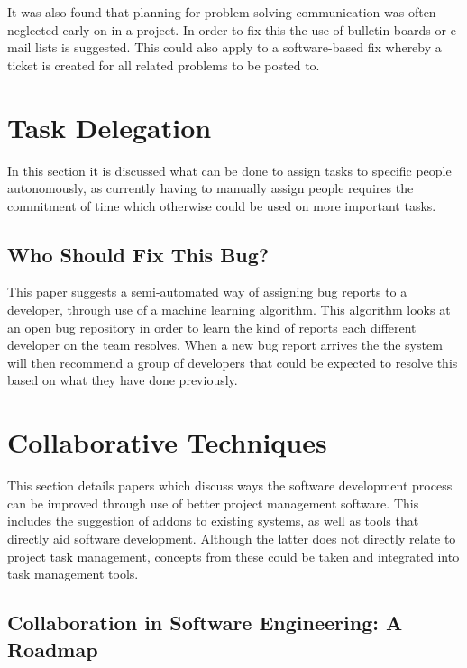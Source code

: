 \documentclass{l4proj}
\begin{document}
It was also found that planning for problem-solving communication was often neglected early on in a project.  In order to fix this the use of bulletin boards or e-mail lists is suggested.  This could also apply to a software-based fix whereby a ticket is created for all related problems to be posted to.

\section {Task Delegation}

In this section it is discussed what can be done to assign tasks to specific people autonomously, as currently having to manually assign people requires the commitment of time which otherwise could be used on more important tasks.


\subsection {Who Should Fix This Bug?}

This paper suggests a semi-automated way of assigning bug reports to a developer, through use of a machine learning algorithm.  This algorithm looks at an open bug repository in order to learn the kind of reports each different developer on the team resolves.  When a new bug report arrives the the system will then recommend a group of developers that could be expected to resolve this based on what they have done previously.%
\section {Collaborative Techniques}

This section details papers which discuss ways the software development process can be improved through use of better project management software.  This includes the suggestion of addons to existing systems, as well as tools that directly aid software development. Although the latter does not directly relate to project task management, concepts from these could be taken and integrated into task management tools.

\subsection {Collaboration in Software Engineering: A Roadmap}
\end{document}
